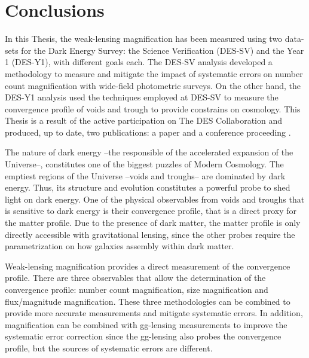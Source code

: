\chapter{Conclusions}
\label{ch:conclusions}
In this Thesis, the weak-lensing magnification has been measured using two data-sets for the Dark Energy Survey: the Science Verification (DES-SV) and the Year 1 (DES-Y1), with different goals each. The DES-SV analysis developed a methodology to measure and mitigate the impact of systematic errors on number count magnification with wide-field photometric surveys. On the other hand, the DES-Y1 analysis used the techniques employed at DES-SV to measure the convergence profile of voids and trough to provide constrains on cosmology. This Thesis is a result of the active participation on The DES Collaboration and produced, up to date, two publications: a paper \cite{2016arXiv161110326G} and a conference proceeding \cite{2017hsa9.conf..163G}.
\newline

The nature of dark energy --the responsible of the accelerated expansion of the Universe--, constitutes one of the biggest puzzles of Modern Cosmology. The emptiest regions of the Universe --voids and troughs-- are dominated by dark energy. Thus, its structure and evolution constitutes a powerful probe to shed light on dark energy. One of the physical observables from voids and troughs that is sensitive to dark energy is their convergence profile, that is a direct proxy for the matter profile. Due to the presence of dark matter, the matter profile is only directly accessible with gravitational lensing, since the other probes require the parametrization on how galaxies assembly within dark matter.
\newline

Weak-lensing magnification provides a direct measurement of the convergence profile. There are three observables that allow the determination of the convergence profile: number count magnification, size magnification and flux/magnitude magnification. These three methodologies can be combined to provide more accurate measurements and mitigate systematic errors. In addition, magnification can be combined with gg-lensing measurements to improve the systematic error correction since the gg-lensing also probes the convergence profile, but the sources of systematic errors are different.
\newline

